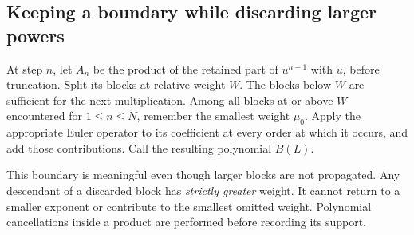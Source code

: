 \documentclass[11pt,a4paper]{article}
\numberwithin{equation}{section}
\theoremstyle{definition}\newtheorem{definition}[theorem]{Definition}
\theoremstyle{remark}\newtheorem{remark}[theorem]{Remark}
\begin{document}
\subsection{Keeping a boundary while discarding larger powers}
At step \(n\), let \(A_n\) be the product of the retained part of \(u^{n-1}\)
with \(u\), before truncation. Split its blocks at relative weight \(W\).
The blocks below \(W\) are sufficient for the next multiplication. Among all
blocks at or above \(W\) encountered for \(1\le n\le N\), remember the
smallest weight \(\mu_0\). Apply the appropriate Euler operator to its
coefficient at every order at which it occurs, and add those contributions.
Call the resulting polynomial \(B(L)\).

This boundary is meaningful even though larger blocks are not propagated.
Any descendant of a discarded block has \emph{strictly greater} weight.
It cannot return to a smaller exponent or contribute to the smallest
omitted weight. Polynomial cancellations inside a product are performed
before recording its support.
\end{document}
